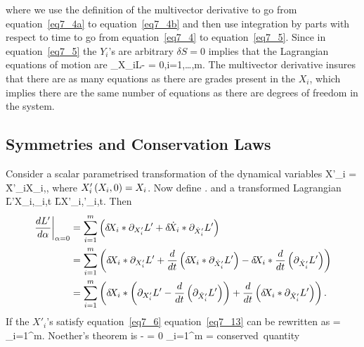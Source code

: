 where we use the definition of the multivector derivative to go from equation~\ref{eq7_4a} to equation~\ref{eq7_4b} and then use integration by parts with respect
to time to go from equation~\ref{eq7_4} to equation~\ref{eq7_5}.  Since in equation~\ref{eq7_5} the $Y_{i}$'s are arbitrary $\delta S=0$ implies that the 
Lagrangian equations of motion are
\be
	\partial_{X_{i}}L- = 0,\hspace{12pt}\forall i=1,\dots,m. \label{eq7_6}
\ee
The multivector derivative insures that there are as many equations as there are grades present in the $X_{i}$, which implies there are the same number of equations
as there are degrees of freedom in the system.

\subsection{Symmetries and Conservation Laws}\label{SandC}
Consider a scalar parametrised transformation of the dynamical variables
\be
	X'_{i} = \f{X'_{i}}{X_{i},\alpha},
\ee
where ${X'_{i}}\left ( {X_{i},0} \right ) = X_{i}$. Now define
\be
	 \equiv {}.
\ee
and a transformed Lagrangian 
\be
	\f{L'}{X_{i},_{i},t} \equiv \f{L}{X'_{i},'_{i},t}.
\ee
Then
\begin{align}
	\left . {\displaystyle\frac{d{L'}}{d{\alpha}}} \right |_{\alpha=0} &= \sum_{i=1}^{m}\left ( {\delta\hspace{-2pt}{X_{i}}*\partial_{X'_{i}}L'+\delta\hspace{-2pt}{\dot{X}_{i}}*\partial_{\dot{X}'_{i}}L'} \right ) \nonumber \\
	                                    &= \sum_{i=1}^{m}\left ( {\delta\hspace{-2pt}{X_{i}}*\partial_{X'_{i}}L'
	                                       +\displaystyle\frac{d{}}{d{t}}\left ( {\delta\hspace{-2pt}{X_{i}}*\partial_{\dot{X}'_{i}}L'} \right )
	                                       -\delta\hspace{-2pt}{X_{i}}*\displaystyle\frac{d{}}{d{t}}\left ( {\partial_{\dot{X}'_{i}}L'} \right )} \right ) \nonumber \\
	                                    &= \sum_{i=1}^{m}\left ( {\delta\hspace{-2pt}{X_{i}}*\left ( {\partial_{X'_{i}}L'
	                                       -\displaystyle\frac{d{}}{d{t}}\left ( {\partial_{\dot{X}'_{i}}L'} \right )} \right )
	                                       +\displaystyle\frac{d{}}{d{t}}\left ( {\delta\hspace{-2pt}{X_{i}*\partial_{\dot{X}'_{i}}L'}} \right )} \right ). \label{eq7_13}
\end{align}
If the $X'_{i}$'s satisfy equation~\ref{eq7_6} equation~\ref{eq7_13} can be rewritten as
\be
	 = \sum_{i=1}^{m}.\label{eq7_14}
\ee
Noether's theorem is -
\be\label{eqPPNT}
    \hspace{-12pt} = 0 \implies \sum_{i=1}^{m} = \mbox{conserved quantity}
\ee

